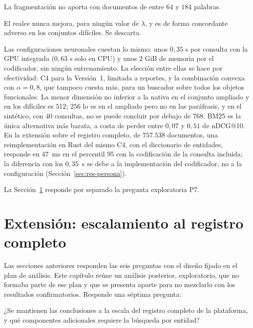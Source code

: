 \documentclass[11pt,letterpaper]{article}
\numberwithin{equation}{section}
\begin{document}
\begin{description}[leftmargin=2.6em,style=nextline,itemsep=2pt]
  \item[\textbf{P4.}] La fragmentación no aporta con documentos de entre $64$ y $184$ palabras.
  \item[\textbf{P5.}] El realce nunca mejora, para ningún valor de $\lambda$, y es de forma concordante adverso en los conjuntos difíciles. Se descarta.
  \item[\textbf{P6.}] Las configuraciones neuronales cuestan lo mismo: unos $0{,}35$ s por consulta con la GPU integrada ($0{,}63$ s solo en CPU) y unos $2$ GiB de memoria por el codificador, sin ningún entrenamiento. La elección entre ellas se hace por efectividad: C4 para la Versión~1, limitada a reportes, y la combinación convexa con $\alpha=0{,}8$, que tampoco cuesta más, para un buscador sobre todos los objetos funcionales. La menor dimensión no inferior a la nativa en el conjunto ampliado y en los difíciles es $512$; $256$ lo es en el ampliado pero no en las paráfrasis, y en el sintético, con $40$ consultas, no se puede concluir por debajo de $768$. BM25 es la única alternativa más barata, a costa de perder entre $0{,}07$ y $0{,}51$ de nDCG@10. En la extensión sobre el registro completo, de $757.538$ documentos, una reimplementación en Rust del mismo C4, con el diccionario de entidades, responde en $47$~ms en el percentil $95$ con la codificación de la consulta incluida; la diferencia con los $0{,}35$~s se debe a la implementación del codificador, no a la configuración (Sección~\ref{sec:res-persona}).
\end{description}
La Sección~\ref{sec:extension} responde por separado la pregunta exploratoria P7.



\section{Extensión: escalamiento al registro completo}
\label{sec:extension}
Las secciones anteriores responden las seis preguntas con el diseño fijado en el plan de análisis. Este capítulo reúne un análisis posterior, exploratorio, que no formaba parte de ese plan y que se presenta aparte para no mezclarlo con los resultados confirmatorios. Responde una séptima pregunta:

\begin{description}[leftmargin=2.6em,style=nextline,itemsep=1pt]
  \item[\textbf{P7} (exploratoria).] ¿Se mantienen las conclusiones a la escala del registro completo de la plataforma, y qué componentes adicionales requiere la búsqueda por entidad?
\end{description}
\end{document}
